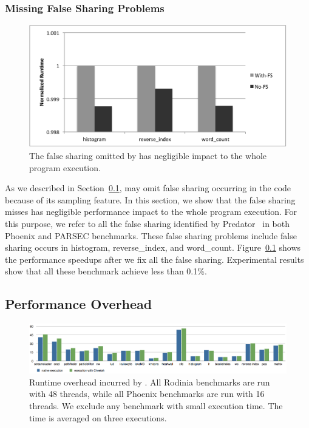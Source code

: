 \subsubsection{Missing False Sharing Problems}

\begin{figure}[htbp]
\centering
\label{fig:fsinfs}
\includegraphics[width=.8\columnwidth]{figure/trivial}
\caption{The false sharing omitted by \cheetah{} has negligible impact to the whole program execution.}
\end{figure}

As we described in Section~\ref{}, \cheetah{} may omit false sharing occurring in the code because of its sampling feature. In this section, we show that the false sharing \cheetah{} misses has negligible performance impact to the whole program execution.  For this purpose, we refer to all the false sharing identified by Predator~\cite{} in both Phoenix and PARSEC benchmarks. These false sharing problems include false sharing occurs in histogram, reverse\_index, and word\_count. Figure~\ref{} shows the performance speedups after we fix all the false sharing. Experimental results show that all these benchmark achieve less than 0.1\%. 

\subsection{Performance Overhead}
\begin{figure}[htbp]
\centering
\label{fig:overhead}
\includegraphics[width=2\columnwidth]{figure/overhead}
\caption{Runtime overhead incurred by \Cheetah{}. All Rodinia benchmarks are run with 48 threads, while all Phoenix benchmarks are run with 16 threads. We exclude any benchmark with small execution time. The time is averaged on three executions.}
\end{figure}


